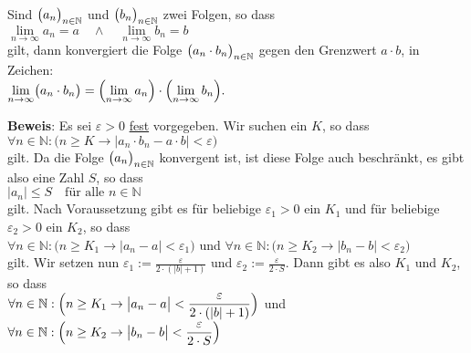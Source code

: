 \begin{Satz}
Sind $\bigl(a_n\bigr)_{n\in\mathbb{N}}$ und $\bigl(b_n\bigr)_{n\in\mathbb{N}}$ zwei Folgen, so dass
\\[0.2cm]
\hspace*{1.3cm}
$ \lim\limits_{n\rightarrow\infty} a_n = a \quad \wedge \quad \lim\limits_{n\rightarrow\infty} b_n = b $
\\[0.2cm]
gilt, dann konvergiert die Folge $\bigl(a_n \cdot b_n\bigr)_{n\in\mathbb{N}}$ gegen den Grenzwert $a\cdot b$, in
Zeichen:
\\[0.2cm]
\hspace*{1.3cm}
$ \lim\limits_{n\rightarrow\infty} \bigl(a_n \cdot b_n\bigr) = 
   \Bigl(\lim\limits_{n\rightarrow\infty} a_n\Bigr) \cdot\Bigl(\lim\limits_{n\rightarrow\infty} b_n\Bigr).
$
\end{Satz}
\textbf{Beweis}:  Es sei $\varepsilon > 0$ \underline{fest} vorgegeben.  Wir suchen ein $K$, so dass
\\[0.2cm]
\hspace*{1.3cm}
$\forall n \in \mathbb{N}:\bigl(n \geq K \rightarrow \bigl|a_n \cdot b_n - a \cdot b\bigr| < \varepsilon\bigr)$
\\[0.2cm]
gilt.  Da die Folge $\bigl(a_n\bigr)_{n\in\mathbb{N}}$ konvergent ist, ist diese Folge auch beschr\"ankt, es gibt
also eine Zahl $S$, so dass  
\\[0.2cm]
\hspace*{1.3cm}
$ |a_n| \leq S \quad \mbox{f\"ur alle $n\in\mathbb{N}$}$
\\[0.2cm]
gilt.
Nach Voraussetzung gibt es f\"ur beliebige $\varepsilon_1 > 0$ ein
$K_1$ und f\"ur beliebige $\varepsilon_2 >0$ ein $K_2$, so dass
\\[0.2cm]
\hspace*{1.3cm}
$\forall n \in \mathbb{N}:\bigl(n \geq K_1 \rightarrow \bigl| a_n - a \bigr| < \varepsilon_1\bigr)$
   \quad \mbox{und} \quad
$\forall n \in \mathbb{N}:\bigl(n \geq K_2 \rightarrow \bigl| b_n - b \bigr| < \varepsilon_2\bigr)$
\\[0.2cm]
gilt.  Wir setzen nun $\varepsilon_1 := \frac{\varepsilon}{2\cdot(|b| + 1)}$ und
$\varepsilon_2 := \frac{\varepsilon}{2\cdot S}$.  Dann gibt es also $K_1$ und
$K_2$, so dass
\\[0.2cm]
\hspace*{1.3cm}
$\displaystyle\forall n \in \mathbb{N}:\Bigl(n \geq K_1 \rightarrow \bigl| a_n - a \bigr| < \frac{\varepsilon}{2\cdot(|b| + 1)}\Bigr)$
\quad \mbox{und} \quad
\\[0.2cm]
\hspace*{1.3cm}
$\displaystyle\forall n \in \mathbb{N}:\Bigl(n \geq K_2 \rightarrow \bigl| b_n - b \bigr| < \frac{\varepsilon}{2\cdot S}\Bigr)$

